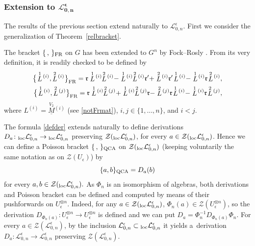 \documentclass[pdftex]{sigma}%
\numberwithin{equation}{section}
\numberwithin{figure}{section}
\newcommand{\e}{\epsilon}
\newcommand{\Ll}{{\mathcal L}}
\newcommand{\ra}{\rightarrow}
\begin{document}
\subsubsection[Extension to L\_\{{0,n}\}\textasciicircum{}e]
{Extension to $\boldsymbol{\Ll_{0,n}^\e}$}\label{EXTENSION}

The results of the previous section extend naturally to $\Ll_{0,n}^\epsilon$. First we consider the generalization of Theorem~\ref{relbracket}.

The bracket $\{\, ,\, \}_{\rm FR}$ on $G$ has been extended to $G^n$ by Fock--Rosly \cite{FR}. From its very definition, it is readily checked to be defined by
\begin{align}
\big\{\!\stackrel{1}{L}\!{}^{(i)},\stackrel{2}{L}\!{}^{(i)}\big\}_{\rm FR} = \mathfrak{r}\stackrel{1}{L}\!{}^{(i)}\!\!\stackrel{2}{L}\!{}^{(i)} -\stackrel{1}{L}\!{}^{(i)}\!\!\stackrel{2}{L}\!{}^{(i)}\mathfrak{r}'+\stackrel{2}{L}\!{}^{(i)}\mathfrak{r}'\!\stackrel{1}{L}\!{}^{(i)} -\stackrel{1}{L}\!{}^{(i)}\mathfrak{r}\!\stackrel{2}{L}\!{}^{(i)},\label{bra1n}
\\
\big\{\!\stackrel{1}{L}\!{}^{(i)},\stackrel{2}{L}\!{}^{(j)} \big\}_{\rm FR} = \mathfrak{r}\stackrel{1}{L}\!{}^{(i)}\!\!\stackrel{2}{L}\!{}^{(j)} +\stackrel{1}{L}\!{}^{(i)}\!\!\stackrel{2}{L}\!{}^{(j)}\mathfrak{r}-\stackrel{2}{L}\!{}^{(j)}\mathfrak{r}\!\stackrel{1}{L}\!{}^{(i)} -\stackrel{1}{L}\!{}^{(i)}\mathfrak{r}\!\stackrel{2}{L}\!{}^{(j)},\label{bra2n}
 \end{align}
where $L^{(i)} = \underline{\stackrel{V_2}{M}}{}^{(i)}$ (see \eqref{notFrmat}), $i,j\in \{1,\dots,n\}$, and $i<j$.

The formula \eqref{defder} extends naturally to define derivations $D_a\colon {}_{\rm loc}\Ll_{0,n}^\epsilon \ra {}_{\rm loc}\Ll_{0,n}^\epsilon$ preserving $\mathcal{Z}({}_{\rm loc}\Ll_{0,n}^\epsilon)$, for every $a\in \mathcal{Z}({}_{\rm loc}\Ll_{0,n}^\epsilon)$. Hence we can define a Poisson bracket $\{\, ,\, \}_{\rm QCA}$ on $\mathcal{Z}({}_{\rm loc}\Ll_{0,n}^\epsilon)$ (keeping voluntarily the same notation as on $\mathcal{Z}(U_\e)$) by \[\{a,b\}_{\rm QCA}= D_a(b)\]
for every $a,b\in\mathcal{Z}({}_{\rm loc}\Ll_{0,n}^\epsilon).$ As $\Phi_n$ is an isomorphism of algebras, both derivations and Poisson bracket can be defined and computed by means of their pushforwards on $U_\e^{\otimes n}$. Indeed, for any $a\in\mathcal{Z}({}_{\rm loc}\Ll_{0,n}^\e)$, $\Phi_n(a) \in \mathcal{Z}(U_\e^{\otimes n})$, so the derivation $D_{\Phi_n(a)}\colon U_\e^{\otimes n} \ra U_\e^{\otimes n}$ is defined and we can put $D_a=\Phi_n^{-1} D_{\Phi_n(a)} \Phi_n$. For every $a\in \mathcal{Z}(\Ll_{0,n}^\epsilon)$, by the inclusion $\Ll_{0,n}^\epsilon \subset {}_{\rm loc}\Ll_{0,n}^\epsilon $ it yields a~derivation $D_a\colon \Ll_{0,n}^\epsilon \ra \Ll_{0,n}^\epsilon$ preserving $\mathcal{Z}(\Ll_{0,n}^\epsilon)$.
\end{document}
